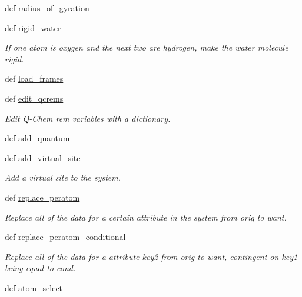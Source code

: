 \begin{DoxyCompactItemize}
\item 
def \hyperlink{classforcebalance_1_1molecule_1_1Molecule_a02ff6f6642ed47c3b1fa3bb00191c32a}{radius\-\_\-of\-\_\-gyration}
\item 
def \hyperlink{classforcebalance_1_1molecule_1_1Molecule_af12c7d375efeffb8a35b8406afc209dc}{rigid\-\_\-water}
\begin{DoxyCompactList}\small\item\em If one atom is oxygen and the next two are hydrogen, make the water molecule rigid. \end{DoxyCompactList}\item 
def \hyperlink{classforcebalance_1_1molecule_1_1Molecule_a68e276a95910d534fa2e937abbc60e1c}{load\-\_\-frames}
\item 
def \hyperlink{classforcebalance_1_1molecule_1_1Molecule_a441d8367806c9a802bd0693fea16c62a}{edit\-\_\-qcrems}
\begin{DoxyCompactList}\small\item\em Edit Q-\/\-Chem rem variables with a dictionary. \end{DoxyCompactList}\item 
def \hyperlink{classforcebalance_1_1molecule_1_1Molecule_a33020ff5e5cec23a3d9d1fe7adfa8583}{add\-\_\-quantum}
\item 
def \hyperlink{classforcebalance_1_1molecule_1_1Molecule_a13d86eb62139bdc2a835756cacb3be66}{add\-\_\-virtual\-\_\-site}
\begin{DoxyCompactList}\small\item\em Add a virtual site to the system. \end{DoxyCompactList}\item 
def \hyperlink{classforcebalance_1_1molecule_1_1Molecule_ad825186bec1659fdad2521a1b377323b}{replace\-\_\-peratom}
\begin{DoxyCompactList}\small\item\em Replace all of the data for a certain attribute in the system from orig to want. \end{DoxyCompactList}\item 
def \hyperlink{classforcebalance_1_1molecule_1_1Molecule_ae565eb57c2ee21f2be19b9761754aba5}{replace\-\_\-peratom\-\_\-conditional}
\begin{DoxyCompactList}\small\item\em Replace all of the data for a attribute key2 from orig to want, contingent on key1 being equal to cond. \end{DoxyCompactList}\item 
def \hyperlink{classforcebalance_1_1molecule_1_1Molecule_a432affdec68562b5b19fd249124480c3}{atom\-\_\-select}

\end{DoxyCompactItemize}
